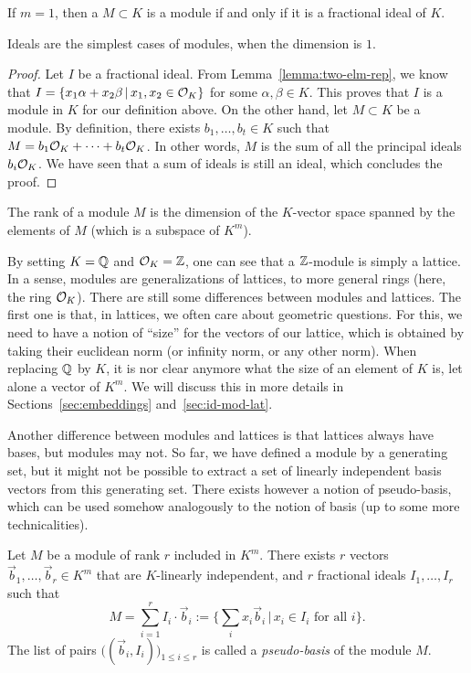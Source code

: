 \begin{lemma}
If $m = 1$, then a $M \subset K$ is a module if and only if it is a fractional ideal of $K$.
\end{lemma}
\noindent Ideals are the simplest cases of modules, when the dimension is $1$.

\begin{proof}
Let $I$ be a fractional ideal. From Lemma~\ref{lemma:two-elm-rep}, we know that $I = \{ x_1 \alpha + x_2 \beta \,|\, x_1, x_2 \in \mathcal{O}_K\}$ for some $\alpha, \beta \in K$. This proves that $I$ is a module in $K$ for our definition above.
On the other hand, let $M \subset K$ be a module. By definition, there exists $b_1, \dots, b_t \in K$ such that $M = b_1 \mathcal{O}_K + \dots + b_t \mathcal{O}_K$. In other words, $M$ is the sum of all the principal ideals $b_i \mathcal{O}_K$. We have seen that a sum of ideals is still an ideal, which concludes the proof.
\end{proof}

\begin{definition}
The rank of a module $M$ is the dimension of the $K$-vector space spanned by the elements of $M$ (which is a subspace of $K^m$).
\end{definition}

By setting $K = \mathbb{Q}$ and $\mathcal{O}_K = \mathbb{Z}$, one can see that a $\mathbb{Z}$-module is simply a lattice. In a sense, modules are generalizations of lattices, to more general rings (here, the ring $\mathcal{O}_K$). There are still some differences between modules and lattices. The first one is that, in lattices, we often care about geometric questions. For this, we need to have a notion of ``size'' for the vectors of our lattice, which is obtained by taking their euclidean norm (or infinity norm, or any other norm). When replacing $\mathbb{Q}$ by $K$, it is nor clear anymore what the size of an element of $K$ is, let alone a vector of $K^m$. We will discuss this in more details in Sections~\ref{sec:embeddings} and~\ref{sec:id-mod-lat}.

Another difference between modules and lattices is that lattices always have bases, but modules may not. So far, we have defined a module by a generating set, but it might not be possible to extract a set of linearly independent basis vectors from this generating set. There exists however a notion of pseudo-basis, which can be used somehow analogously to the notion of basis (up to some more technicalities).

\begin{lemma}
Let $M$ be a module of rank $r$ included in $K^m$. There exists $r$ vectors $\vec b_1, \dots, \vec b_r \in K^m$ that are $K$-linearly independent, and $r$ fractional ideals $I_1, \dots, I_r$ such that
\[ M = \sum_{i = 1}^r I_i \cdot \vec b_i := \{ \sum_i x_i \vec b_i \,|\, x_i \in I_i \text{ for all }i\}.\]
The list of pairs $\big((\vec b_i, I_i)\big)_{1 \leq i \leq r}$ is called a \emph{pseudo-basis} of the module $M$.
\end{lemma}

